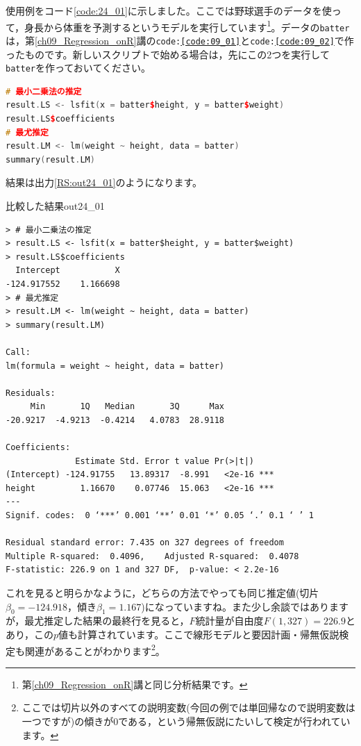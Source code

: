 \documentclass{ltjbook}
\begin{document}
使用例をコード\ref{code:24_01}に示しました。ここでは野球選手のデータを使って，身長から体重を予測するというモデルを実行しています\footnote{第\ref{ch09_Regression_onR}講と同じ分析結果です。}。データの\verb|batter|は，第\ref{ch09_Regression_onR}講の\texttt{code:\ref{code:09_01}}と\texttt{code:\ref{code:09_02}}で作ったものです。新しいスクリプトで始める場合は，先にこの2つを実行して\verb|batter|を作っておいてください。
\begin{lstlisting}[language=c++,label={code:24_01},caption={二つの推定法の比較}]
# 最小二乗法の推定
result.LS <- lsfit(x = batter$height, y = batter$weight)
result.LS$coefficients
# 最尤推定
result.LM <- lm(weight ~ height, data = batter)
summary(result.LM)
\end{lstlisting}
結果は出力\ref{RS:out24_01}のようになります。
\begin{Rscreen}{比較した結果}{out24_01}
	\begin{verbatim}
> # 最小二乗法の推定
> result.LS <- lsfit(x = batter$height, y = batter$weight)
> result.LS$coefficients
  Intercept           X 
-124.917552    1.166698 
> # 最尤推定
> result.LM <- lm(weight ~ height, data = batter)
> summary(result.LM)

Call:
lm(formula = weight ~ height, data = batter)

Residuals:
     Min       1Q   Median       3Q      Max 
-20.9217  -4.9213  -0.4214   4.0783  28.9118 

Coefficients:
              Estimate Std. Error t value Pr(>|t|)    
(Intercept) -124.91755   13.89317  -8.991   <2e-16 ***
height         1.16670    0.07746  15.063   <2e-16 ***
---
Signif. codes:  0 ‘***’ 0.001 ‘**’ 0.01 ‘*’ 0.05 ‘.’ 0.1 ‘ ’ 1

Residual standard error: 7.435 on 327 degrees of freedom
Multiple R-squared:  0.4096,	Adjusted R-squared:  0.4078 
F-statistic: 226.9 on 1 and 327 DF,  p-value: < 2.2e-16
    \end{verbatim}
\end{Rscreen}

これを見ると明らかなように，どちらの方法でやっても同じ推定値(切片$\beta_0=-124.918$，傾き$\beta_1=1.167$)になっていますね。また少し余談ではありますが，最尤推定した結果の最終行を見ると，$F$統計量が自由度$F(1,327)=226.9$とあり，この$p$値も計算されています。ここで線形モデルと要因計画・帰無仮説検定も関連があることがわかります\footnote{ここでは切片以外のすべての説明変数(今回の例では単回帰なので説明変数は一つですが)の傾きが0である，という帰無仮説にたいして検定が行われています。}。
\end{document}
